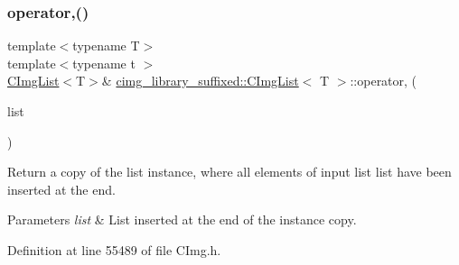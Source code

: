 \mbox{\label{structcimg__library__suffixed_1_1CImgList_ad6ba5284d68a09c1164e49eb638f7e45}} 
\subsubsection{\texorpdfstring{operator,()}{operator,()}\hspace{0.1cm}{\footnotesize\ttfamily [2/2]}}
{\footnotesize\ttfamily template$<$typename T$>$ \\
template$<$typename t $>$ \\
\hyperlink{structcimg__library__suffixed_1_1CImgList}{C\+Img\+List}$<$T$>$\& \hyperlink{structcimg__library__suffixed_1_1CImgList}{cimg\+\_\+library\+\_\+suffixed\+::\+C\+Img\+List}$<$ T $>$\+::operator, (\begin{DoxyParamCaption}\item[{const \hyperlink{structcimg__library__suffixed_1_1CImgList}{C\+Img\+List}$<$ t $>$ \&}]{list }\end{DoxyParamCaption})\hspace{0.3cm}{\ttfamily [inline]}}



Return a copy of the list instance, where all elements of input list {\ttfamily list} have been inserted at the end. 


\begin{DoxyParams}{Parameters}
{\em list} & List inserted at the end of the instance copy. \\
\hline
\end{DoxyParams}


Definition at line 55489 of file C\+Img.\+h.

\mbox{\label{structcimg__library__suffixed_1_1CImgList_a3266dc5ed4eb07625e6ad2cd310a65fb}} 
